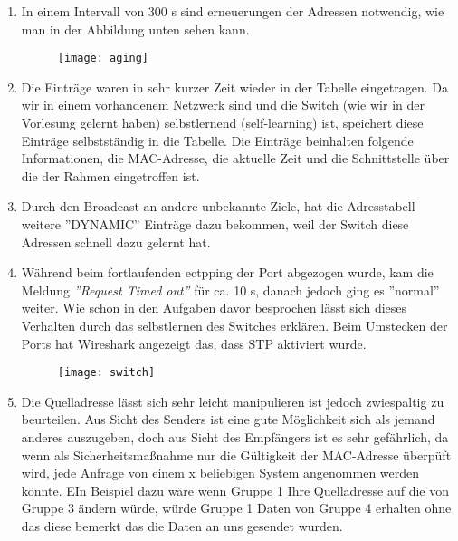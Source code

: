 \documentclass{scrartcl}
\begin{document}
  \renewcommand{\labelenumi}{\alph{enumi})}
  \begin{enumerate}
    \item
    In einem Intervall von 300 s sind erneuerungen der Adressen notwendig, wie man in der Abbildung unten sehen kann.
    
    \begin{figure}
    \texttt{[image: aging]}
    \label{fig:aging}
    \end{figure}
  
  \item
  Die Einträge waren in sehr kurzer Zeit wieder in der Tabelle eingetragen. Da wir in einem vorhandenem Netzwerk sind und die Switch (wie wir in der Vorlesung gelernt haben) selbstlernend (self-learning) ist, speichert diese Einträge selbstständig in die Tabelle. Die Einträge beinhalten folgende Informationen, die MAC-Adresse, die aktuelle Zeit und die Schnittstelle über die der Rahmen eingetroffen ist.
  
  \item
  Durch den Broadcast an andere unbekannte Ziele, hat die Adresstabell weitere ''DYNAMIC'' Einträge dazu bekommen, weil der Switch diese Adressen schnell dazu gelernt hat.
  
  \item
  Während beim fortlaufenden ectpping der Port abgezogen wurde, kam die Meldung \textit{''Request Timed out''} für ca. 10 s, danach jedoch ging es ''normal'' weiter. Wie schon in den Aufgaben davor besprochen lässt sich dieses Verhalten durch das selbstlernen des Switches erklären. Beim Umstecken der Ports hat Wireshark angezeigt das, dass STP aktiviert wurde.
  
  \begin{figure}
  \texttt{[image: switch]}
  \label{fig:switch}
  \end{figure}
  
  \item
  Die Quelladresse lässt sich sehr leicht manipulieren ist jedoch zwiespaltig zu beurteilen. Aus Sicht des Senders ist eine gute Möglichkeit sich als jemand anderes auszugeben, doch aus Sicht des Empfängers ist es sehr gefährlich, da wenn als Sicherheitsmaßnahme nur die Gültigkeit der MAC-Adresse überpüft wird, jede Anfrage von einem x beliebigen System angenommen werden könnte. EIn Beispiel dazu wäre wenn Gruppe 1 Ihre Quelladresse auf die von Gruppe 3 ändern würde, würde Gruppe 1 Daten von Gruppe 4 erhalten ohne das diese bemerkt das die Daten an uns gesendet wurden.
    \end{enumerate}
    
\end{document}
